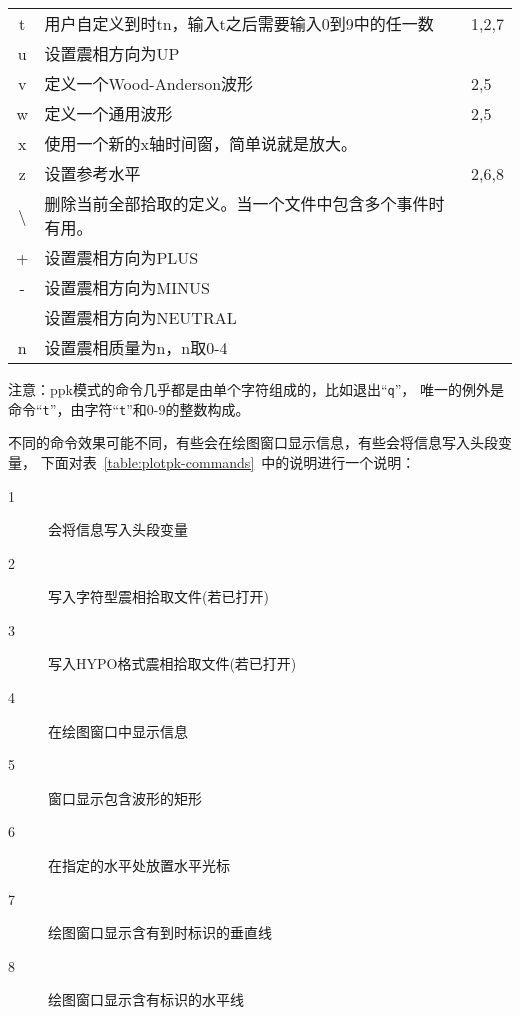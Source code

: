 \begin{table}[H]
\begin{tabular}{cll}
    t	    &	用户自定义到时tn，输入t之后需要输入0到9中的任一数	&   1,2,7\\
    u	    &	设置震相方向为UP	                    &           \\
    v	    &	定义一个Wood-Anderson波形               &   2,5 	\\
    w	    &	定义一个通用波形                        &   2,5 	\\
    x	    &	使用一个新的x轴时间窗，简单说就是放大。 &           \\
    z	    &	设置参考水平                            &   2,6,8	\\
    \textbackslash	    &	删除当前全部拾取的定义。当一个文件中包含多个事件时有用。&	\\
    +	    &	设置震相方向为PLUS	                    &           \\
    -	    &	设置震相方向为MINUS	                    &           \\
    \lstinline[showspaces]! !   &	设置震相方向为NEUTRAL	                &           \\
    n	    &	设置震相质量为n，n取0-4	                &           \\
	\bottomrule
\end{tabular}
\end{table}
注意：ppk模式的命令几乎都是由单个字符组成的，比如退出``\verb+q+''，
唯一的例外是命令``\verb+t+''，由字符``\verb+t+''和0-9的整数构成。

不同的命令效果可能不同，有些会在绘图窗口显示信息，有些会将信息写入头段变量，
下面对表~\ref{table:plotpk-commands}~中的说明进行一个说明：
\begin{description}
    \item [1] 会将信息写入头段变量
    \item [2] 写入字符型震相拾取文件(若已打开)
    \item [3] 写入HYPO格式震相拾取文件(若已打开)
    \item [4] 在绘图窗口中显示信息
    \item [5] 窗口显示包含波形的矩形
    \item [6] 在指定的水平处放置水平光标
    \item [7] 绘图窗口显示含有到时标识的垂直线
    \item [8] 绘图窗口显示含有标识的水平线
\end{description}
